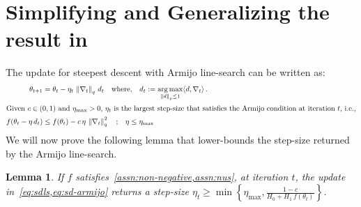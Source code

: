 \documentclass{article}
\newtheorem{lemma}{Lemma}
\newcommand{\normsq}[1]{\left\|#1 \right\|^{2}}
\newcommand{\norm}[1]{\left\|#1 \right\|}
\newcommand{\tht}{\theta_t}
\newcommand{\thtt}{\theta_{t+1}}
\newcommand{\etat}{{\eta_t}}
\DeclareMathOperator*{\argmax}{arg\,max}
\begin{document}
\section{Simplifying and Generalizing the result in~\citet{vaswani2025armijo}}
\label{app:ls}
The update for steepest descent with Armijo line-search can be written as:
\begin{align}
\thtt &= \tht - \etat \, \norm{\nabla_t}_{q} \, d_t \quad \text{where,} \quad d_t := \argmax_{\norm{d}_p \leq 1} \langle d, \nabla_t \rangle \,. \label{eq:sdls} \\
\intertext{Given $c \in (0,1)$ and $\eta_{\max} > 0$, $\etat$ is the largest step-size that satisfies the Armijo condition at iteration $t$, i.e.,}
f(\tht - \eta \, d_t) & \leq f(\tht) - c \, \eta \,  \normsq{\nabla_t}_{q} \quad \text{;} \quad \eta \leq \eta_{\max} \label{eq:sd-armijo}
\end{align}
We will now prove the following lemma that lower-bounds the step-size returned by the Armijo line-search. 
\begin{lemma}
If $f$ satisfies~\cref{assn:non-negative,assn:nus}, at iteration $t$, the update in~\cref{eq:sdls,eq:sd-armijo}  returns a step-size $\etat \geq \min \left\{ \eta_{\max},\frac{1 - c}{H_0 + H_1 \, f(\tht)} \right\}$. 
\label{lemma:armijo-lb}
\end{lemma}
\end{document}
